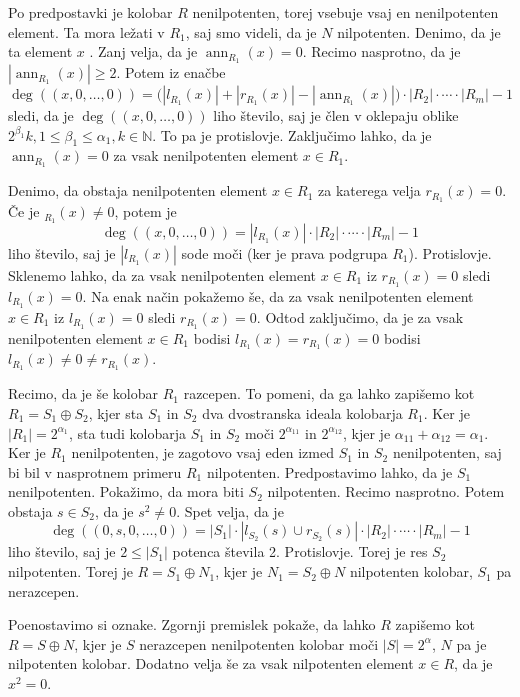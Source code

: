\documentclass[a4paper, 12pt]{amsart}
\theoremstyle{definition} %
\theoremstyle{plain} %
\newcommand{\N}{\mathbb N}
\DeclareMathOperator{\ann}{ann}
\begin{document}
Po predpostavki je kolobar $R$ nenilpotenten, torej vsebuje vsaj en nenilpotenten element. Ta mora ležati v $R_1$, saj smo videli, da je $N$ nilpotenten. Denimo, da je ta element $x$ . Zanj velja, da je $\ann_{R_1}(x) = 0$. Recimo nasprotno, da je $|\ann_{R_1}(x)|\ge 2$. Potem iz enačbe 
$$
\deg ((x,0,\dots,0)) = \big( |l_{R_1}(x) | + |r_{R_1}(x)| - |\ann_{R_1}(x)| \big) \cdot |R_2| \cdot \cdots \cdot |R_m| - 1
$$
sledi, da je $\deg((x,0,\dots,0))$ liho število, saj je člen v oklepaju oblike $2^{\beta_1}k, 1\le \beta_1 \le \alpha_1, k\in \N$. To pa je protislovje. Zaključimo lahko, da je $\ann_{R_1}(x) = 0$ za vsak nenilpotenten element $x\in R_1$.

Denimo, da obstaja nenilpotenten element $x\in R_1$ za katerega velja $r_{R_1}(x) = 0$. Če je $_{R_1}(x) \neq 0$, potem je 
$$
\deg((x,0,\dots,0)) = |l_{R_1}(x)| \cdot |R_2| \cdot \cdots  \cdot |R_m| -1
$$  
liho število, saj je $|l_{R_1}(x)|$ sode moči (ker je prava podgrupa $R_1$). Protislovje. Sklenemo lahko, da za vsak nenilpotenten element $x\in R_1$ iz $r_{R_1}(x) = 0$ sledi $l_{R_1}(x) = 0$. Na enak način pokažemo še, da za vsak nenilpotenten element $x\in R_1$ iz $l_{R_1}(x) = 0$ sledi $r_{R_1}(x) = 0$. Odtod zaključimo, da je za vsak nenilpotenten element $x\in R_1$ bodisi $l_{R_1}(x) = r_{R_1}(x) = 0$ bodisi $l_{R_1}(x) \neq 0 \neq r_{R_1}(x)$.

Recimo, da je še kolobar $R_1$ razcepen. To pomeni, da ga lahko zapišemo kot $R_1 = S_1 \oplus S_2$, kjer sta $S_1$ in $S_2$ dva dvostranska ideala kolobarja $R_1$. Ker je $|R_1| = 2^{\alpha_1}$, sta tudi kolobarja $S_1$ in $S_2$ moči $2^{\alpha_{11}}$ in $2^{\alpha_{12}}$, kjer je $\alpha_{11} + \alpha_{12} = \alpha_1$. Ker je $R_1$ nenilpotenten, je zagotovo vsaj eden izmed $S_1$ in $S_2$ nenilpotenten, saj bi bil v nasprotnem primeru $R_1$ nilpotenten. Predpostavimo lahko, da je $S_1$ nenilpotenten. Pokažimo, da mora biti $S_2$ nilpotenten. Recimo nasprotno. Potem obstaja $s  \in S_2$, da je $s^2 \neq 0$. Spet velja, da je 
$$
\deg((0,s,0,\dots,0)) = |S_1|\cdot |l_{S_2}(s) \cup r_{S_2}(s)| \cdot |R_2| \cdot \cdots \cdot |R_m| - 1
$$
liho število, saj je $2\le |S_1|$ potenca števila 2. Protislovje. Torej je res $S_2$ nilpotenten. Torej je $R= S_1 \oplus N_1$, kjer je $N_1 = S_2\oplus N$ nilpotenten kolobar, $S_1$ pa nerazcepen.

Poenostavimo si oznake. Zgornji premislek pokaže, da lahko $R$ zapišemo kot $R = S\oplus N$, kjer je $S$ nerazcepen nenilpotenten kolobar moči $|S| = 2^{\alpha}$, $N$ pa je nilpotenten kolobar. Dodatno velja še za vsak nilpotenten element $x\in R$, da je $x^2 = 0$.
\end{document}
